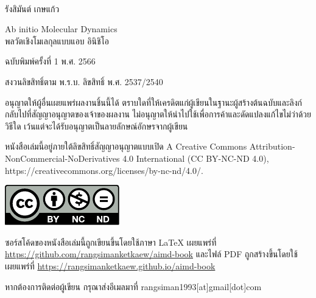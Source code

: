 

{
~\vfill
\thispagestyle{empty}
\setlength{\parindent}{0em}

รังสิมันต์ เกษแก้ว

Ab initio Molecular Dynamics\\
พลวัตเชิงโมเลกุลแบบแอบ อินิชิโอ

\bigskip

\par{ฉบับพิมพ์ครั้งที่ 1 พ.ศ. 2566}

สงวนลิขสิทธิ์ตาม พ.ร.บ. ลิขสิทธิ์ พ.ศ. 2537/2540

อนุญาตให้ผู้อื่นเผยแพร่ผลงานชิ้นนี้ได้ ตราบใดที่ให้เครดิตแก่ผู้เขียนในฐานะผู้สร้างต้นฉบับและลิงก์กลับไปที่สัญญาอนุญาตของเจ้าของผลงาน 
ไม่อนุญาตให้นำไปใช้เพื่อการค้าและดัดแปลงแก้ไขไม่ว่าด้วยวิธีใด เว้นแต่จะได้รับอนุญาตเป็นลายลักษณ์อักษรจากผู้เขียน

หนังสือเล่มนี้อยู่ภายใต้ลิขสิทธิ์สัญญาอนุญาตแบบเปิด A Creative Commons Attribution-NonCommercial-NoDerivatives 4.0 
International (CC BY-NC-ND 4.0), https://creativecommons.org/licenses/by-nc-nd/4.0/.

\includegraphics[scale=1.2]{front_matter/by-nc-nd.pdf}

\bigskip

ซอร์สโค้ดของหนังสือเล่มนี้ถูกเขียนขึ้นโดยใช้ภาษา {\selectfont \LaTeX} เผยแพร่ที่ 
\url{https://github.com/rangsimanketkaew/aimd-book} และไฟล์ PDF ถูกสร้างขึ้นโดยใช้ {\selectfont 
\XeLaTeX} เผยแพร่ที่ \url{https://rangsimanketkaew.github.io/aimd-book}

หากต้องการติดต่อผู้เขียน กรุณาส่งอีเมลมาที่ rangsiman1993[at]gmail[dot]com
}
